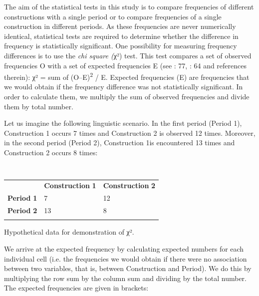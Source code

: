 The aim of the statistical tests in this study is to compare frequencies of different constructions with a single period or to compare frequencies of a single construction in different periods. As these frequencies are never numerically identical, statistical tests are required to determine whether the difference in frequency is statistically significant. One possibility for measuring frequency differences is to use the \textit{chi square (}χ²) test. This test compares a set of observed frequencies O with a set of expected frequencies E (see \citealt{Baayen2008}: 77, \citealt{Author2018}: 64 and references therein): χ² = sum of (O–E)\textsuperscript{2} / E. Expected frequencies (E) are frequencies that we would obtain if the frequency difference was not statistically significant. In order to calculate them, we multiply the sum of observed frequencies and divide them by total number.

  Let us imagine the following linguistic scenario. In the first period (Period 1), Construction 1 occurs 7 times and Construction 2 is observed 12 times. Moreover, in the second period (Period 2), Construction 1is encountered 13 times and Construction 2 occurs 8 times:

\begin{table}
\begin{tabularx}{\textwidth}{XXX}
\lsptoprule
\multicolumn{1}{c}{} & \textbf{Construction} \textbf{1} & \textbf{Construction} \textbf{2}\\
 \textbf{Period} \textbf{1} & 7 & 12\\
 \textbf{Period} \textbf{2} & 13 & 8\\
\lspbottomrule
\end{tabularx}
{\caption{\label{tab:} ~}Hypothetical data for demonstration of χ².}
\end{table}

We arrive at the expected frequency by calculating expected numbers for each individual cell (i.e. the frequencies we would obtain if there were no association between two variables, that is, between Construction and Period). We do this by multiplying the row sum by the column sum and dividing by the total number. The expected frequencies are given in brackets:


